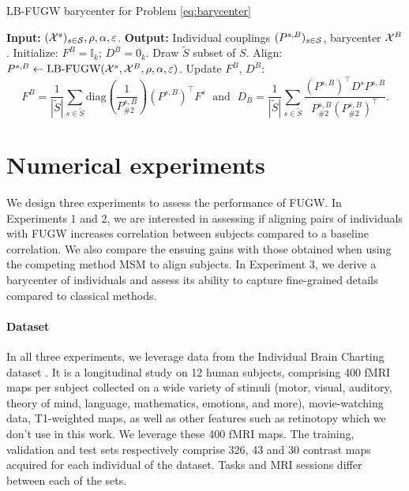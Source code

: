 \begin{algorithm}[t]
    \caption{LB-FUGW barycenter for Problem \eqref{eq:barycenter}}
    \label{alg:fugw_barycenter}
    \begin{algorithmic}[1]
        \STATE \textbf{Input:} $(\mathcal X^s)_{s \in \mathcal S}, \rho, \alpha, \varepsilon$.
        \STATE \textbf{Output:} Individual couplings $(P^{s, B})_{s \in \mathcal S}$, barycenter $\mathcal X^B$.
        \STATE Initialize: $F^B = \mathbb I_k$; $D^B = 0_k$.
            \STATE Draw $\widetilde{S}$ subset of $S$.
                \STATE Align: $P^{s, B} \gets \text{LB-FUGW}(\mathcal X^s, \mathcal X^B, \rho, \alpha, \varepsilon)$.
            \ENDFOR
            \STATE Update $F^B$, $D^B$:
            \begin{equation*}
                F^B = \frac{1}{| \widetilde{S} |} \sum_{s \in \widetilde{S}}
                \text{diag} \left( \frac{1}{P^{s, B}_{\# 2}} \right)
                (P^{s, B})^\top F^s \; \text{ and } \;
                D_B = \frac{1}{| \widetilde{S} |} \sum_{s \in \widetilde{S}}
                \frac{(P^{s, B})^\top D^s P^{s, B}}{P^{s, B}_{\# 2} (P^{s, B}_{\# 2})^\top}.
            \end{equation*}
        \ENDWHILE
    \end{algorithmic}
\end{algorithm}

\section{Numerical experiments}

We design three experiments to assess the performance of FUGW.
In Experiments 1 and 2, we are interested in assessing if aligning pairs of individuals with
FUGW increases correlation between subjects compared to a baseline correlation.
We also compare the ensuing gains with those obtained when using the
competing method MSM \citep{robinson_msm_2014,robinson_multimodal_2018} to align subjects.
In Experiment 3, we derive a barycenter of individuals and assess its ability to capture fine-grained
details compared to classical methods.

\paragraph{Dataset}
\label{par:dataset}
In all three experiments, we leverage data from the Individual Brain Charting dataset \citep{ibc}.
It is a longitudinal study on 12 human subjects,
comprising 400 fMRI maps per subject collected
on a wide variety of stimuli (motor, visual, auditory, theory of mind,
language, mathematics, emotions, and more), movie-watching data, T1-weighted maps, as well as other features such as
retinotopy which we don't use in this work. We leverage these 400 fMRI maps.
The training, validation and test sets respectively comprise
326, 43 and 30 contrast maps acquired for each individual of the dataset.
Tasks and MRI sessions differ between each of the sets.

